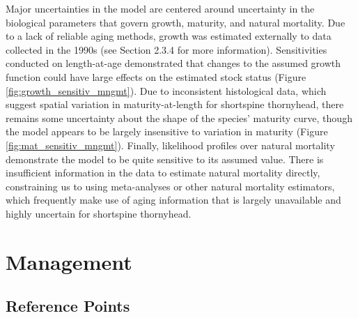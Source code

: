 \documentclass[11pt,
  english,
  letterpaper,
]{article}
\begin{document}
Major uncertainties in the model are centered around uncertainty in the biological parameters that govern growth, maturity, and natural mortality. Due to a lack of reliable aging methods, growth was estimated externally to data collected in the 1990s (see Section 2.3.4 for more information). Sensitivities conducted on length-at-age demonstrated that changes to the assumed growth function could have large effects on the estimated stock status (Figure \ref{fig:growth_sensitiv_mngmt}). Due to inconsistent histological data, which suggest spatial variation in maturity-at-length for shortspine thornyhead, there remains some uncertainty about the shape of the species' maturity curve, though the model appears to be largely insensitive to variation in maturity (Figure \ref{fig:mat_sensitiv_mngmt}). Finally, likelihood profiles over natural mortality demonstrate the model to be quite sensitive to its assumed value. There is insufficient information in the data to estimate natural mortality directly, constraining us to using meta-analyses or other natural mortality estimators, which frequently make use of aging information that is largely unavailable and highly uncertain for shortspine thornyhead.

\hypertarget{management}{%
\section{Management}\label{management}}

\hypertarget{reference-points-1}{%
\subsection{Reference Points}\label{reference-points-1}}
\end{document}
